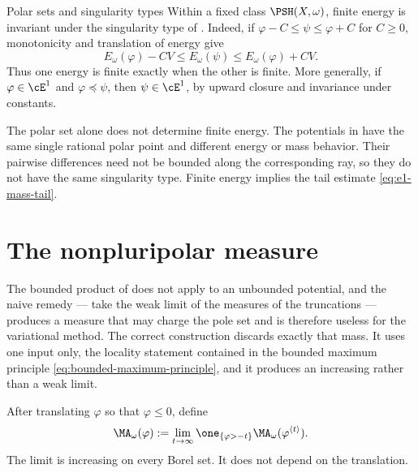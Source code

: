 \begin{warning}{Polar sets and singularity types}
Within a fixed class $\PSH(X,\omega)$, finite energy is invariant under the singularity type of . Indeed, if $\varphi-C\leq\psi\leq\varphi+C$ for $C\geq0$, monotonicity and translation of energy give
\[
 E_\omega(\varphi)-CV\leq E_\omega(\psi)
                  \leq E_\omega(\varphi)+CV.
\]
Thus one energy is finite exactly when the other is finite. More generally, if $\varphi\in\cE^1$ and $\varphi\preceq\psi$, then $\psi\in\cE^1$, by upward closure and invariance under constants.

The polar set alone does not determine finite energy.  The potentials in
have the same single rational polar point and different energy or mass
behavior.  Their pairwise differences need not be bounded along the
corresponding ray, so they do not have the same singularity type.  Finite
energy implies the tail estimate \eqref{eq:e1-mass-tail}.
\end{warning}

\section{The nonpluripolar measure}
\label{sec:ch26-nonpluripolar}

The bounded product of  does not apply to an
unbounded potential, and the naive remedy --- take the weak limit of the
measures of the truncations --- produces a measure that may charge the pole
set and is therefore useless for the variational method.  The correct
construction discards exactly that mass.  It uses one input only, the
locality statement contained in the bounded maximum principle
\eqref{eq:bounded-maximum-principle}, and it produces an increasing rather
than a weak limit.

\begin{definition}
\label{def:nonpluripolar-ma}
After translating $\varphi$ so that $\varphi\leq0$, define
\begin{equation}
\label{eq:nonpluripolar-ma}
 \MA_\omega(\varphi)
 :=\lim_{t\to\infty}
 \one_{\{\varphi>-t\}}
 \MA_\omega(\varphi^{\langle t\rangle}).
\end{equation}
The limit is increasing on every Borel set. It does not depend on the
translation.
\end{definition}

